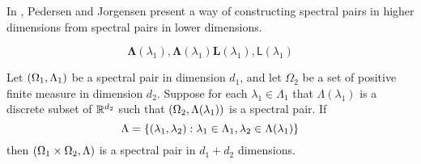 \documentclass[../thesis.tex]{subfiles}
\begin{document}
In \cite{jorgensenSpectralPairsCartesian2001}, Pedersen and Jorgensen present a way of constructing spectral pairs in higher dimensions from spectral pairs in lower dimensions. 

\begin{equation*}
    \mathbf{\Lambda}(\lambda_1), \mathbf{\Lambda}(\lambda_1)
    \mathbf{L}(\lambda_1), \mathsf{L}(\lambda_1)
\end{equation*}

\begin{theorem}\label{thrm:construction_spectra}
    Let $(\Omega_1,\Lambda_1)$ be a spectral pair in dimension $d_1$, and let $\Omega_2$ be a set of positive finite measure in dimension $d_2$. Suppose for each $\lambda_1 \in \Lambda_1$ that $\Lambda(\lambda_1)$ is a discrete subset of $\mathbb{R}^{d_2}$ such that $(\Omega_2,\Lambda(\lambda_1))$ is a spectral pair. If 
    \begin{equation*}
        \Lambda = \{(\lambda_1, \lambda_2): \lambda_1\in \Lambda_1, \lambda_2 \in \Lambda(\lambda_1)\} 
    \end{equation*}
    then $(\Omega_1\times\Omega_2, \Lambda)$ is a spectral pair in $d_1+d_2$ dimensions. 
\end{theorem}
\end{document}
